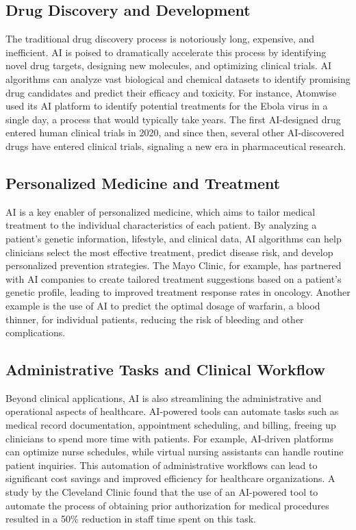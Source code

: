 \subsection{Drug Discovery and Development}

The traditional drug discovery process is notoriously long, expensive, and inefficient. AI is poised to dramatically accelerate this process by identifying novel drug targets, designing new molecules, and optimizing clinical trials. AI algorithms can analyze vast biological and chemical datasets to identify promising drug candidates and predict their efficacy and toxicity. For instance, Atomwise used its AI platform to identify potential treatments for the Ebola virus in a single day, a process that would typically take years. The first AI-designed drug entered human clinical trials in 2020, and since then, several other AI-discovered drugs have entered clinical trials, signaling a new era in pharmaceutical research.

\subsection{Personalized Medicine and Treatment}

AI is a key enabler of personalized medicine, which aims to tailor medical treatment to the individual characteristics of each patient. By analyzing a patient's genetic information, lifestyle, and clinical data, AI algorithms can help clinicians select the most effective treatment, predict disease risk, and develop personalized prevention strategies. The Mayo Clinic, for example, has partnered with AI companies to create tailored treatment suggestions based on a patient's genetic profile, leading to improved treatment response rates in oncology. Another example is the use of AI to predict the optimal dosage of warfarin, a blood thinner, for individual patients, reducing the risk of bleeding and other complications.

\subsection{Administrative Tasks and Clinical Workflow}

Beyond clinical applications, AI is also streamlining the administrative and operational aspects of healthcare. AI-powered tools can automate tasks such as medical record documentation, appointment scheduling, and billing, freeing up clinicians to spend more time with patients. For example, AI-driven platforms can optimize nurse schedules, while virtual nursing assistants can handle routine patient inquiries. This automation of administrative workflows can lead to significant cost savings and improved efficiency for healthcare organizations. A study by the Cleveland Clinic found that the use of an AI-powered tool to automate the process of obtaining prior authorization for medical procedures resulted in a 50\% reduction in staff time spent on this task.

